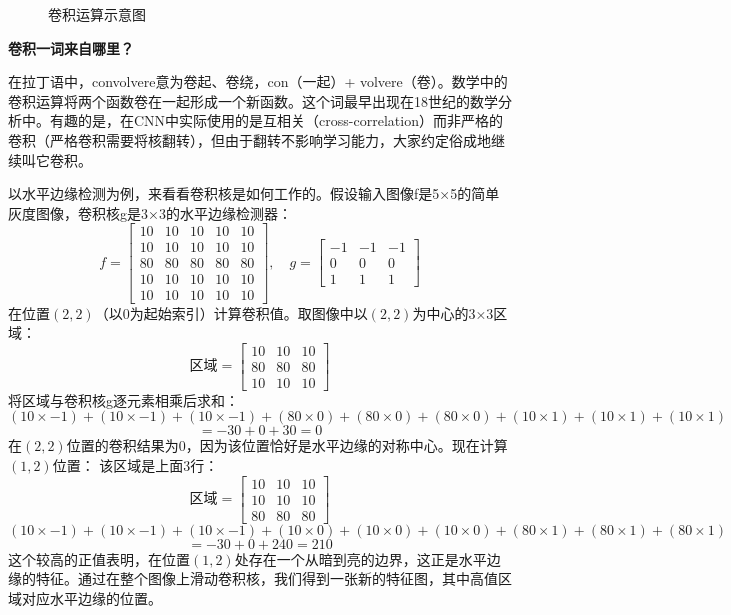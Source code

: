 \begin{figure}[H]
\centering
{}
\caption{卷积运算示意图}
\label{fig:ch2_2_15}
\end{figure}

\begin{knowledgebox}
\small
\textbf{卷积一词来自哪里？}

在拉丁语中，convolvere意为卷起、卷绕，con（一起）+ volvere（卷）。数学中的卷积运算将两个函数卷在一起形成一个新函数。这个词最早出现在18世纪的数学分析中。有趣的是，在CNN中实际使用的是互相关（cross-correlation）而非严格的卷积（严格卷积需要将核翻转），但由于翻转不影响学习能力，大家约定俗成地继续叫它卷积。
\end{knowledgebox}

以水平边缘检测为例，来看看卷积核是如何工作的。假设输入图像f是5×5的简单灰度图像，卷积核g是3×3的水平边缘检测器：
\[
f = \begin{bmatrix}
10 & 10 & 10 & 10 & 10 \\
10 & 10 & 10 & 10 & 10 \\
80 & 80 & 80 & 80 & 80 \\
10 & 10 & 10 & 10 & 10 \\
10 & 10 & 10 & 10 & 10
\end{bmatrix}, \quad
g = \begin{bmatrix}
-1 & -1 & -1 \\
0 & 0 & 0 \\
1 & 1 & 1
\end{bmatrix}
\]
在位置$(2, 2)$（以0为起始索引）计算卷积值。取图像中以$(2,2)$为中心的3×3区域：
\[
\text{区域} = \begin{bmatrix}
10 & 10 & 10 \\
80 & 80 & 80 \\
10 & 10 & 10
\end{bmatrix}
\]
将区域与卷积核g逐元素相乘后求和：
\[
(10 \times -1) + (10 \times -1) + (10 \times -1) + (80 \times 0) + (80 \times 0) + (80 \times 0) + (10 \times 1) + (10 \times 1) + (10 \times 1)
\]
\[
= -30 + 0 + 30 = 0
\]
在$(2,2)$位置的卷积结果为0，因为该位置恰好是水平边缘的对称中心。现在计算$(1,2)$位置：
该区域是上面3行：
\[
\text{区域} = \begin{bmatrix}
10 & 10 & 10 \\
10 & 10 & 10 \\
80 & 80 & 80
\end{bmatrix}
\]
\[
(10 \times -1) + (10 \times -1) + (10 \times -1) + (10 \times 0) + (10 \times 0) + (10 \times 0) + (80 \times 1) + (80 \times 1) + (80 \times 1)
\]
\[
= -30 + 0 + 240 = 210
\]
这个较高的正值表明，在位置$(1,2)$处存在一个从暗到亮的边界，这正是水平边缘的特征。通过在整个图像上滑动卷积核，我们得到一张新的特征图，其中高值区域对应水平边缘的位置。

